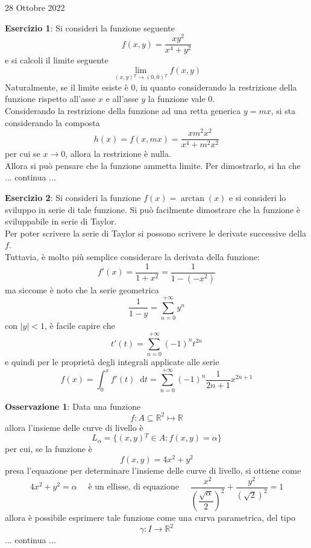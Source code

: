 \documentclass[a4paper]{extarticle}
\newcommand*\dif{\mathop{}\!\mathrm{d}}
\begin{document}
\newpage
\noindent
\begin{center}
    28 Ottobre 2022
\end{center}

\vspace{1em}
\noindent
\textbf{Esercizio 1}: Si consideri la funzione seguente
\[f(x,y) = \dfrac{xy^2}{x^4+y^2}\]
e si calcoli il limite seguente
\[\lim_{(x,y){^T} \to (0,0){^T}} f(x,y)\]
Naturalmente, se il limite esiste è $0$, in quanto considerando la restrizione della funzione rispetto all'asse $x$ e all'asse $y$ la funzione vale $0$.\\
Considerando la restrizione della funzione ad una retta generica $y=mx$, si sta considerando la composta
\[h(x)=f(x,mx)=\frac{xm^2x^2}{x^4+m^2x^2}\]
per cui se $x \to 0$, allora la restrizione è nulla.\\
Allora si può pensare che la funzione ammetta limite. Per dimostrarlo, si ha che ... continua ...

\vspace{1em}
\noindent
\textbf{Esercizio 2}: Si consideri la funzione $f(x)=\arctan(x)$ e si consideri lo sviluppo in serie di tale funzione. Si può facilmente dimostrare che la funzione è sviluppabile in serie di Taylor.\\
Per poter scrivere la serie di Taylor si possono scrivere le derivate successive della $f$.\\
Tuttavia, è molto più semplice considerare la derivata della funzione:
\[f'(x)=\frac{1}{1+x^2}=\frac{1}{1-(-x^2)}\]
ma siccome è noto che la serie geometrica
\[\frac{1}{1-y}=\sum_{n=0}^{+\infty} y^n\]
con $\left \vert y \right \vert < 1$, è facile capire che
\[t'(t)=\sum_{n=0}^{+\infty}(-1)^n t^{2n}\]
e quindi per le proprietà degli integrali applicate alle serie
\[f(x)=\int_0^x f'(t) \dif t = \sum_{n=0}^{+\infty} (-1)^n \frac{1}{2n+1} x^{2n+1}\]

\vspace{1em}
\noindent
\textbf{Osservazione 1}: Data una funzione
\[f : A \subseteq \mathbb{R}^2 \longmapsto \mathbb{R}\]
allora l'insieme delle curve di livello è
\[L_\alpha = \{(x,y){^T} \in A : f(x,y)=\alpha\}\]
per cui, se la funzione è
\[f(x,y) = 4x^2+y^2\]
presa l'equazione per determinare l'insieme delle curve di livello, si ottiene come
\[4x^2+y^2=\alpha \hspace{1em} \text{ è un ellisse, di equazione } \hspace{1em} \dfrac{x^2}{\left(\dfrac{\sqrt{\alpha}}{2}\right)^2} + \dfrac{y^2}{\left(\sqrt{2}\right)^2} = 1\]
allora è possibile esprimere tale funzione come una curva parametrica, del tipo
\[\gamma : I \rightarrow \mathbb{R}^2\]
... continua ...
\end{document}
